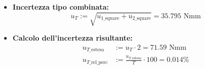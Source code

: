 \documentclass[a4paper, twoside]{article}
\begin{document}
\begin{itemize}
{\begin{equation}
u_{2\_\text{square}} := A + B + C + D = 4.908 \text{ (Nmm)}^{2}
\end{equation}
}

\item{
\vspace{0.5cm}
\noindent
\textbf{Incertezza tipo combinata:}
\begin{equation}
u_{T} := \sqrt{u_{1\_\text{square}} + u_{2\_\text{square}}} = 35.795 \text{ Nmm}
\end{equation}
}

\item{
\vspace{0.5cm}
\noindent
\textbf{Calcolo dell'incertezza risultante:}
\begin{align}
u_{T\_\text{estesa}} &:= u_{T} \cdot 2 = 71.59 \text{ Nmm} \\
u_{T\_\text{rel\_perc}} &:= \frac{u_{T\_\text{estesa}}}{T} \cdot 100 = 0.014 \%
\end{align}
}

\end{itemize}
\end{document}

